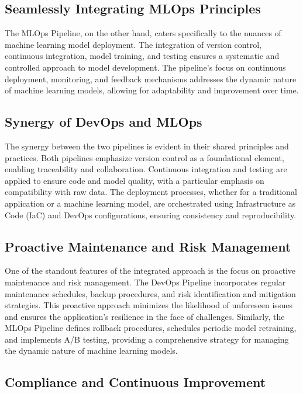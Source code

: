 \documentclass[12pt, letterpaper]{article}
\begin{document}
\subsection{Seamlessly Integrating MLOps Principles}

The MLOps Pipeline, on the other hand, caters specifically to the nuances of machine learning model deployment. The integration of version control, continuous integration, model training, and testing ensures a systematic and controlled approach to model development. The pipeline's focus on continuous deployment, monitoring, and feedback mechanisms addresses the dynamic nature of machine learning models, allowing for adaptability and improvement over time.

\subsection{Synergy of DevOps and MLOps}

The synergy between the two pipelines is evident in their shared principles and practices. Both pipelines emphasize version control as a foundational element, enabling traceability and collaboration. Continuous integration and testing are applied to ensure code and model quality, with a particular emphasis on compatibility with raw data. The deployment processes, whether for a traditional application or a machine learning model, are orchestrated using Infrastructure as Code (IaC) and DevOps configurations, ensuring consistency and reproducibility.

\subsection{Proactive Maintenance and Risk Management}

One of the standout features of the integrated approach is the focus on proactive maintenance and risk management. The DevOps Pipeline incorporates regular maintenance schedules, backup procedures, and risk identification and mitigation strategies. This proactive approach minimizes the likelihood of unforeseen issues and ensures the application's resilience in the face of challenges. Similarly, the MLOps Pipeline defines rollback procedures, schedules periodic model retraining, and implements A/B testing, providing a comprehensive strategy for managing the dynamic nature of machine learning models.

\subsection{Compliance and Continuous Improvement}
\end{document}
